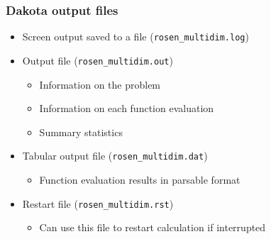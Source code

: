 \documentclass[t]{beamer}
\begin{document}
\begin{frame}
  \frametitle{Dakota output files}
  \begin{itemize}
    \item Screen output saved to a file (\lstinline{rosen_multidim.log})
    \item Output file (\lstinline{rosen_multidim.out})
    \begin{itemize}
      \item Information on the problem
      \item Information on each function evaluation
      \item Summary statistics
    \end{itemize}
    \item Tabular output file (\lstinline{rosen_multidim.dat})
    \begin{itemize}
      \item Function evaluation results in parsable format
    \end{itemize}
    \item Restart file (\lstinline{rosen_multidim.rst})
    \begin{itemize}
      \item Can use this file to restart calculation if interrupted
    \end{itemize}
  \end{itemize}
\end{frame}

\end{document}
